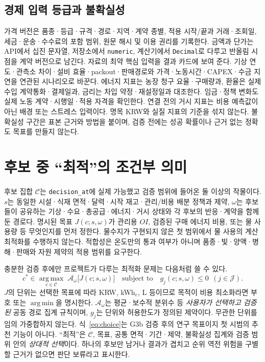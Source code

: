 \documentclass[11pt,a4paper]{article}
\newcommand{\hold}{\textsf{판단 보류}}
\begin{document}
\subsection{경제 입력 등급과 불확실성}
가격 버전은 품종·등급·규격·경로·지역·계약 종별, 적용 시작/끝과 거래·조회일, 세금·운송·수수료의 포함 범위, 원문 해시 및 이용 권리를 기록한다. 금액과 단가는 API에서 십진 문자열, 저장소에서 \texttt{numeric}, 계산기에서 \texttt{Decimal}로 다루고 반올림 시점을 계약 버전으로 남긴다. 자료의 최약 핵심 입력을 결과 카드에 보여 준다. 기상 연도·관측소 차이·설비 효율·packout·판매경로와 가격·노동시간·CAPEX·수금 지연을 연관된 시나리오로 바꾼다. 에너지 지표는 농장 청구 요율·구매량과, 환율은 실제 수입 계약통화·결제일과, 금리는 차입 약정·재설정일과 대조한다. 임금·정책 변화도 실제 노동 계약·시행일·적용 자격을 확인한다. 연결 전의 거시 지표는 비용 예측값이 아닌 배경 또는 스트레스 입력이다. 명목 KRW와 실질 지표의 기준을 섞지 않는다. 불확실성 구간은 표본 근거와 방법을 붙이며, 검증 전에는 성공 확률이나 근거 없는 정확도 목표를 만들지 않는다.

\section{후보 중 ``최적''의 조건부 의미}
후보 집합 $\mathcal C$는 \texttt{decision\_at}에 실제 가능했고 검증 범위에 들어온 둘 이상의 작물이다. $s$는 동일한 시설·식재 면적·달력·시작 재고·관리/비용 배분 정책과 제약, $\omega$는 후보들이 공유하는 기상·수요·총공급·에너지·거시 상태와 각 후보의 반응·계약을 함께 둔 경로다. 명시된 목표 $J(c;s,\omega)$가 관리용 $OI$, 검증된 구매 에너지 비용, 또는 물 사용량 등 무엇인지를 먼저 정한다. 물수지가 구현되지 않은 첫 범위에서 물 사용의 계산 최적화를 수행하지 않는다. 적합성은 온도만의 통과 여부가 아니며 품종·빛·양액·병해·판매와 자원 제약의 적용 범위를 요구한다.

충분한 검증 후에만 프로젝트가 다루는 최적화 문제는 다음처럼 쓸 수 있다.
\begin{equation}
c^*\in\underset{c\in\mathcal C}{\operatorname{arg\,max}}\;\mathcal{A}_{\omega}
\bigl[J(c;s,\omega)\bigr]
\quad\text{subject to}\quad
g_j(c;s,\omega)\leq 0\ \ (j\in\mathcal J).\label{eq:choice}
\end{equation}
$J$의 단위는 선택한 목표에 따라 KRW, kWh$_e$, L 등이므로 목적이 비용 최소화라면 부호 또는 \(\operatorname{arg\,min}\)을 명시한다. $\mathcal A_\omega$는 평균·보수적 분위수 등 \emph{사용자가 선택하고 검증된} 공동 경로 집계 규칙이며, $g_j$는 단위와 허용한도가 정의된 제약이다. 무관한 단위를 임의 가중합하지 않는다. 식~\eqref{eq:choice}는 G3b 검증 후의 연구 목표이지 첫 시범의 추천 기능이 아니다. ``최적''은 $\mathcal C$, 목표, 공통 면적·기간·제약, 불확실성 집계와 검증 범위 안의 \emph{상대적 선택}이다. 하나의 후보만 남거나 결과가 겹치고 순위 역전 위험을 구별할 근거가 없으면 \hold 라고 표시한다.
\end{document}
